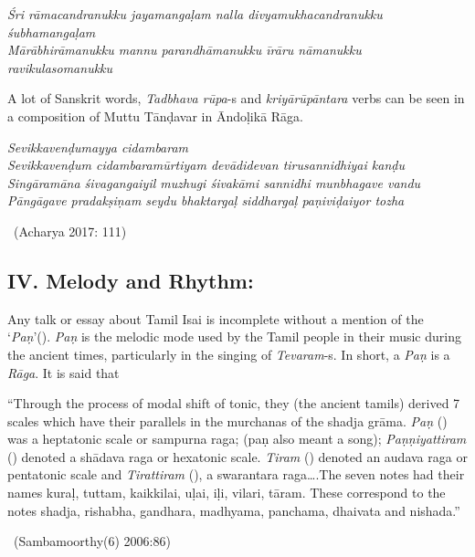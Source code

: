 \begin{myquote}
\textit{Śri rāmacandranukku jayamangaḷam nalla divyamukhacandranukku śubha\break mangaḷam}\\\textit{Mārābhirāmanukku mannu parandhāmanukku īrāru nāmanukku ravikulasomanukku}
\end{myquote}

\begin{myquote}
A lot of Sanskrit words, \textit{Tadbhava rūpa}-s and \textit{kriyārūpāntara} verbs can be seen in a composition of Muttu Tānḍavar in Āndoḷikā Rāga.
\end{myquote}

\begin{myquote}
\textit{Sevikkavenḍumayya cidambaram}\\\textit{Sevikkavenḍum cidambaramūrtiyam devādidevan tirusannidhiyai kanḍu}\\\textit{Singāramāna śivagangaiyil muzhugi śivakāmi sannidhi munbhagave vandu}\\\textit{Pāngāgave pradakṣiṇam seydu bhaktargaḷ siddhargaḷ paṇiviḍaiyor tozha}

~\hfill (Acharya 2017: 111)
\end{myquote}



\subsection*{IV. Melody and Rhythm:}

Any talk or essay about Tamil Isai is incomplete without a mention of the ‘\textit{Paṇ}’(). \textit{Paṇ} is the melodic mode used by the Tamil people in their music during the ancient times, particularly in the singing of \textit{Tevaram}-s. In short, a \textit{Paṇ} is a \textit{Rāga}. It is said that

\begin{myquote}
“Through the process of modal shift of tonic, they (the ancient tamils) derived 7 scales which have their parallels in the murchanas of the shadja grāma. \textit{Paṇ} () was a heptatonic scale or sampurna raga; (paṇ also meant a song); \textit{Paṇṇiyattiram} () denoted a shādava raga or hexatonic scale. \textit{Tiram} () denoted an audava raga or pentatonic scale and \textit{Tirattiram} (), a swarantara raga….The seven notes had their names kuraḷ, tuttam, kaikkilai, uḷai, iḷi, vilari, tāram. These correspond to the notes shadja, rishabha, gandhara, madhyama, panchama, dhaivata and nishada.”

~\hfill (Sambamoorthy(6) 2006:86)
\end{myquote}

